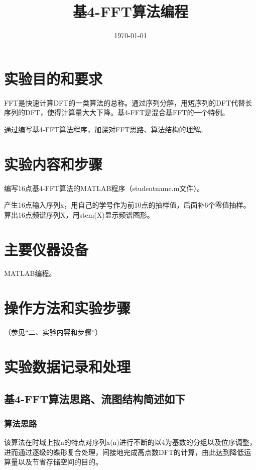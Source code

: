 \documentclass{../source/Experiment}
\title{基4-FFT算法编程}
\date{\today}
\begin{document}
    \makeheader
    \section{实验目的和要求}

    FFT是快速计算DFT的一类算法的总称。通过序列分解，用短序列的DFT代替长序列的DFT，使得计算量大大下降。基4-FFT是混合基FFT的一个特例。

    通过编写基4-FFT算法程序，加深对FFT思路、算法结构的理解。


    \section{实验内容和步骤}
    编写16点基4-FFT算法的MATLAB程序（studentname.m文件）。

    产生16点输入序列x，用自己的学号作为前10点的抽样值，后面补6个零值抽样。算出16点频谱序列X，用stem(X)显示频谱图形。

    \section{主要仪器设备}

    MATLAB编程。

    \section{操作方法和实验步骤}

    （参见“二、实验内容和步骤”）

    \section{实验数据记录和处理}
        \subsection{基4-FFT算法思路、流图结构简述如下}
            \subsubsection{算法思路}
            该算法在时域上按n的特点对序列x(n)进行不断的以4为基数的分组以及位序调整，进而通过逐级的蝶形复合处理，间接地完成高点数DFT的计算，由此达到降低运算量以及节省存储空间的目的。
\end{document}
